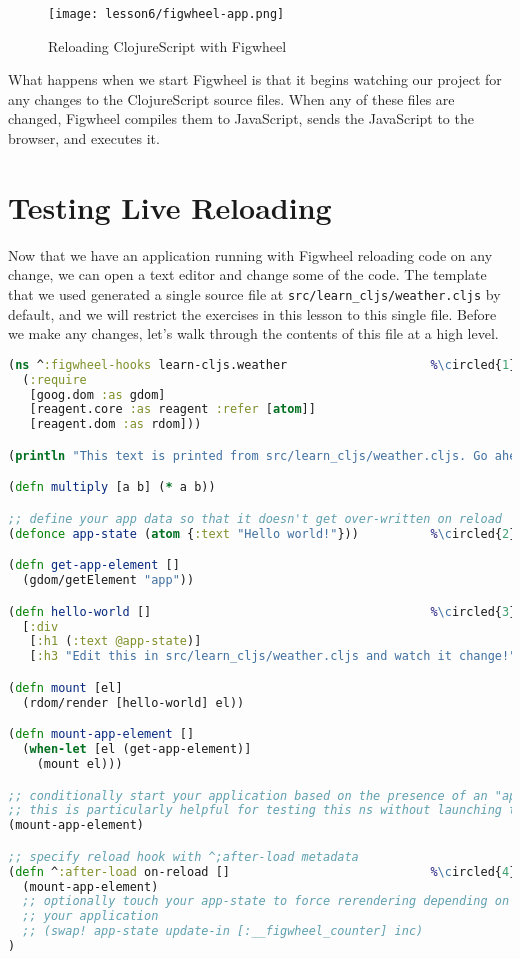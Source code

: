\documentclass[10pt,twoside,openright]{memoir}
\newcommand*\circled[1]{\tikz[baseline=(char.base)]{
            \node[shape=circle,draw,inner sep=1pt] (char) {#1};}}
\begin{document}
\begin{figure}[H]
\caption{Reloading ClojureScript with Figwheel}
\centering
\texttt{[image: lesson6/figwheel-app.png]}
\end{figure}

What happens when we start Figwheel is that it begins watching our
project for any changes to the ClojureScript source files. When any of
these files are changed, Figwheel compiles them to JavaScript, sends the
JavaScript to the browser, and executes it.

\section{Testing Live Reloading}

Now that we have an application running with Figwheel reloading code on
any change, we can open a text editor and change some of the code. The
template that we used generated a single source file at
\texttt{src/learn\_cljs/weather.cljs} by default, and we will restrict
the exercises in this lesson to this single file. Before we make any
changes, let's walk through the contents of this file at a high level.

\begin{lstlisting}[language=Clojure, caption={cljs\_weather/core.cljs}]
  (ns ^:figwheel-hooks learn-cljs.weather                    %\circled{1}%
  (:require
   [goog.dom :as gdom]
   [reagent.core :as reagent :refer [atom]]
   [reagent.dom :as rdom]))

(println "This text is printed from src/learn_cljs/weather.cljs. Go ahead and edit it and see reloading in action.")

(defn multiply [a b] (* a b))

;; define your app data so that it doesn't get over-written on reload
(defonce app-state (atom {:text "Hello world!"}))          %\circled{2}%

(defn get-app-element []
  (gdom/getElement "app"))

(defn hello-world []                                       %\circled{3}%
  [:div
   [:h1 (:text @app-state)]
   [:h3 "Edit this in src/learn_cljs/weather.cljs and watch it change!"]])

(defn mount [el]
  (rdom/render [hello-world] el))

(defn mount-app-element []
  (when-let [el (get-app-element)]
    (mount el)))

;; conditionally start your application based on the presence of an "app" element
;; this is particularly helpful for testing this ns without launching the app
(mount-app-element)

;; specify reload hook with ^;after-load metadata
(defn ^:after-load on-reload []                            %\circled{4}%
  (mount-app-element)
  ;; optionally touch your app-state to force rerendering depending on
  ;; your application
  ;; (swap! app-state update-in [:__figwheel_counter] inc)
)
\end{lstlisting}
\end{document}
